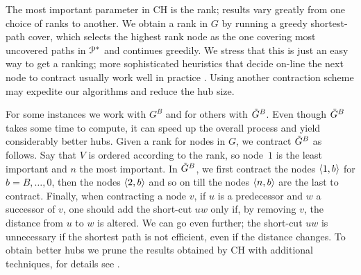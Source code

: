 The most important parameter in CH is the rank; results vary greatly from one choice of ranks to another.
We obtain a rank in $G$ by running a greedy shortest-path cover, which selects the highest rank node as the one covering most uncovered paths in $\mathcal{P}^*$ and continues greedily.
We stress that this is just an easy way to get a ranking; more sophisticated heuristics that decide on-line the next node to contract usually work well in practice \cite{goldberg_survey,rice_csp}.
Using another contraction scheme may expedite our algorithms and reduce the hub size.

For some instances we work with $G^B$ and for others with $\tilde G^B$.
Even though $\tilde G^B$ takes some time to compute, it can speed up the overall process and yield considerably better hubs. 
Given a rank for nodes in $G$, we contract $\tilde G^B$ as follows.
Say that $V$ is ordered according to the rank, so node~$1$ is the least important and $n$ the most important.
In $\tilde G^B$, we first contract the nodes $\langle1,b\rangle$ for $b=B,\ldots,0$, then the nodes $\langle2,b\rangle$ and so on till the nodes $\langle n,b\rangle$ are the last to contract. 
Finally, when contracting a node $v$, if $u$ is a predecessor and $w$ a successor of $v$, one should add the short-cut $uw$ only if, by removing $v$, the distance from $u$ to $w$ is altered.
We can go even further; the short-cut $uw$ is unnecessary if the shortest path is not efficient, even if the distance changes.
To obtain better hubs we prune the results obtained by CH with additional techniques, for details see \cite{TechReport}.

